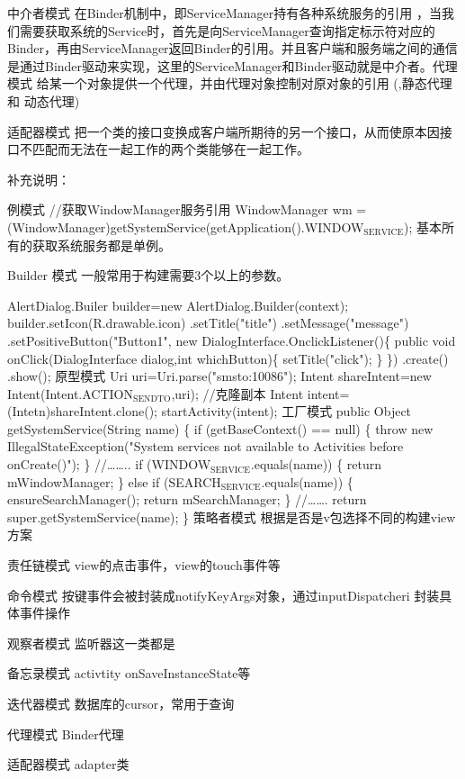 \documentclass[9pt, b5paper]{article}
\begin{document}
中介者模式
在Binder机制中，即ServiceManager持有各种系统服务的引用 ，当我们需要获取系统的Service时，首先是向ServiceManager查询指定标示符对应的Binder，再由ServiceManager返回Binder的引用。并且客户端和服务端之间的通信是通过Binder驱动来实现，这里的ServiceManager和Binder驱动就是中介者。代理模式
给某一个对象提供一个代理，并由代理对象控制对原对象的引用 (,静态代理 和 动态代理)

适配器模式
把一个类的接口变换成客户端所期待的另一个接口，从而使原本因接口不匹配而无法在一起工作的两个类能够在一起工作。

补充说明：

例模式
//获取WindowManager服务引用
WindowManager wm = (WindowManager)getSystemService(getApplication().WINDOW$_{\text{SERVICE}}$);  
基本所有的获取系统服务都是单例。

Builder 模式
一般常用于构建需要3个以上的参数。

AlertDialog.Builer builder=new AlertDialog.Builder(context); 
builder.setIcon(R.drawable.icon) 
 .setTitle("title") 
 .setMessage("message") 
 .setPositiveButton("Button1", new DialogInterface.OnclickListener()\{ 
       public void onClick(DialogInterface dialog,int whichButton)\{ 
             setTitle("click"); 
        \} 
 \}) 
 .create() 
 .show();
原型模式
Uri uri=Uri.parse("smsto:10086"); 
Intent shareIntent=new Intent(Intent.ACTION$_{\text{SENDTO}}$,uri); 
//克隆副本 
Intent intent=(Intetn)shareIntent.clone(); startActivity(intent);
工厂模式
public Object getSystemService(String name) \{ 
      if (getBaseContext() == null) \{ 
          throw new IllegalStateException("System services not available to Activities before onCreate()"); 
     \}
    //\ldots{}\ldots{}.. 
      if (WINDOW$_{\text{SERVICE}}$.equals(name)) \{ 
          return mWindowManager; 
     \} else if (SEARCH$_{\text{SERVICE}}$.equals(name)) \{ 
         ensureSearchManager(); 
          return mSearchManager; 
     \} //\ldots{}\ldots{}. 
      return super.getSystemService(name); \}
策略者模式
根据是否是v包选择不同的构建view方案

责任链模式
view的点击事件，view的touch事件等

命令模式
按键事件会被封装成notifyKeyArgs对象，通过inputDispatcheri 封装具体事件操作

观察者模式
监听器这一类都是

备忘录模式
activtity onSaveInstanceState等

迭代器模式
数据库的cursor，常用于查询

代理模式
Binder代理

适配器模式
adapter类
\end{document}
